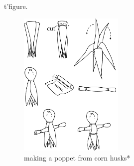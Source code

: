 \documentclass[twoside,11pt,b5paper,twocolumn]{scrbook}
\begin{document}
t'figure.\begin{figure}\centering\includegraphics[width=5cm]{encyclopedia/poppet}\caption{making a poppet from corn husks*}\end{figure}
\end{document}
